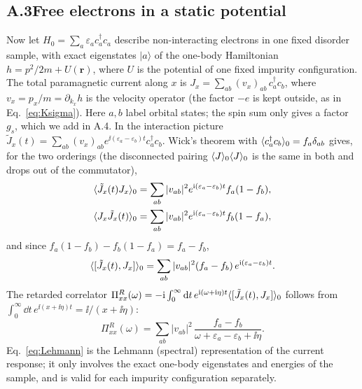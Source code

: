 \subsection*{A.3\quad Free electrons in a static potential}
Now let $H_0=\sum_a\varepsilon_a c_a^\dagger c_a$ describe non-interacting electrons in one fixed disorder sample, with exact eigenstates $|a\rangle$ of the one-body Hamiltonian $h=p^2/2m+U(\mathbf r)$, where $U$ is the potential of one fixed impurity configuration. The total paramagnetic current along $x$ is $J_x=\sum_{ab}(v_x)_{ab}\,c_a^\dagger c_b$, where $v_x=p_x/m=\partial_{k_x}h$ is the velocity operator (the factor $-e$ is kept outside, as in Eq.~\eqref{eq:Ksigma}). Here $a,b$ label orbital states; the spin sum only gives a factor $g_s$, which we add in A.4. In the interaction picture $\tilde J_x(t)=\sum_{ab}(v_x)_{ab}e^{\ii(\varepsilon_a-\varepsilon_b)t}c_a^\dagger c_b$. Wick's theorem with $\langle c_a^\dagger c_b \rangle_0=f_a\delta_{ab}$ gives, for the two orderings (the disconnected pairing $\langle J \rangle_0\langle J \rangle_0$ is the same in both and drops out of the commutator),
\begin{align}
\langle \tilde J_x(t)J_x \rangle_0&=\sum_{ab}|v_{ab}|^2e^{\mathrm{i}(\varepsilon_a-\varepsilon_b)t}f_a(1-f_b),\\
\langle J_x\tilde J_x(t) \rangle_0&=\sum_{ab}|v_{ab}|^2e^{\mathrm{i}(\varepsilon_a-\varepsilon_b)t}f_b(1-f_a),
\end{align}
and since $f_a(1-f_b)-f_b(1-f_a)=f_a-f_b$,
\begin{equation}
\langle [\tilde J_x(t),J_x] \rangle_0=\sum_{ab}|v_{ab}|^2(f_a-f_b)\,e^{\mathrm{i}(\varepsilon_a-\varepsilon_b)t}.
\end{equation}
The retarded correlator $\Pi^R_{xx}(\omega)=-\mathrm{i}\int_0^\infty\mathrm{d} t\,e^{\mathrm{i}(\omega+\mathrm{i}\eta)t}\langle [\tilde J_x(t),J_x] \rangle_0$ follows from $\int_0^\infty\dd t\,e^{\ii(x+\ii\eta)t}=\ii/(x+\ii\eta)$:
\begin{equation}
\Pi^R_{xx}(\omega)=\sum_{ab}|v_{ab}|^2\,\frac{f_a-f_b}{\omega+\varepsilon_a-\varepsilon_b+\ii\eta}.
\label{eq:Lehmann}
\end{equation}
Eq.~\eqref{eq:Lehmann} is the Lehmann (spectral) representation of the current response; it only involves the exact one-body eigenstates and energies of the sample, and is valid for each impurity configuration separately.

